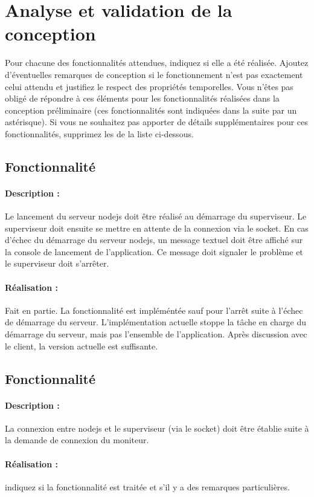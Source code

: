 \documentclass[11pt, a4paper]{paper}
\newcounter{cptreq}
\begin{document}
\section{Analyse et validation de la conception}

{\color{red}Pour chacune des fonctionnalités attendues, indiquez si elle a été réalisée. Ajoutez d'éventuelles remarques de conception si le fonctionnement n'est pas exactement celui attendu et justifiez le respect des propriétés temporelles. Vous n'êtes pas obligé de répondre à ces éléments pour les fonctionnalités réalisées dans la conception préliminaire (ces fonctionnalités sont indiquées dans la suite par un astérisque). Si vous ne souhaitez pas apporter de détails supplémentaires pour ces fonctionnalités, supprimez les de la liste ci-dessous.}

{\color{gray}
\subsection{Fonctionnalité \thecptreq *}

\paragraph{Description :} Le lancement du serveur nodejs doit être réalisé au démarrage du superviseur. Le superviseur doit ensuite se mettre en attente de la connexion via le socket. En cas d'échec du démarrage du serveur nodejs, un message textuel doit être  affiché sur la console de lancement de l'application. Ce message doit signaler le problème et le superviseur doit s'arrêter.

\paragraph{\color{black}Réalisation :}  {\color{blue} Fait en partie. La fonctionnalité est impléméntée sauf pour l'arrêt suite à l'échec de démarrage du serveur. L'implémentation actuelle stoppe la tâche en charge du démarrage du serveur, mais pas l'ensemble de l'application. Après discussion avec le client, la version actuelle est suffisante.}
}
{\color{gray}
\subsection{Fonctionnalité \thecptreq *}

\paragraph{Description :} La connexion entre nodejs et le superviseur (via le socket) doit être établie suite à la demande de connexion du moniteur.

\paragraph{\color{black}Réalisation :}  {\color{red} indiquez si la fonctionnalité est traitée et s'il y a des remarques particulières.}
}
\end{document}
